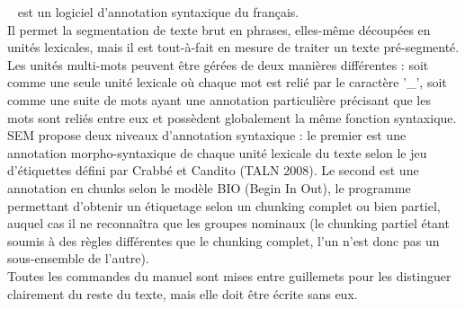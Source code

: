 \documentclass[manual-fr.tex]{subfiles}
\begin{document}
\SEMFull\ \cite{Tellier_demo2012} est un logiciel d'annotation syntaxique du français.\\

Il permet la segmentation de texte brut en phrases, elles-même découpées en unités lexicales, mais il est tout-à-fait en mesure de traiter un texte
pré-segmenté. Les unités multi-mots peuvent être gérées de deux manières différentes : soit comme une seule unité lexicale où chaque mot est relié
par le caractère '\_', soit comme une suite de mots ayant une annotation particulière précisant que les mots sont reliés entre eux et possèdent
globalement la même fonction syntaxique.\\

SEM propose deux niveaux d'annotation syntaxique : le premier est une annotation morpho-syntaxique de chaque unité lexicale du texte selon le jeu
d'étiquettes défini par Crabbé et Candito (TALN 2008). Le second est une annotation en chunks selon le modèle BIO (Begin In Out), le programme
permettant d'obtenir un étiquetage selon un chunking complet ou bien partiel, auquel cas il ne reconnaîtra que les groupes nominaux (le chunking
partiel étant soumis à des règles différentes que le chunking complet, l'un n'est donc pas un sous-ensemble de l'autre).\\

Toutes les commandes du manuel sont mises entre guillemets pour les distinguer clairement du reste du texte, mais elle doit être écrite sans eux.
\end{document}
